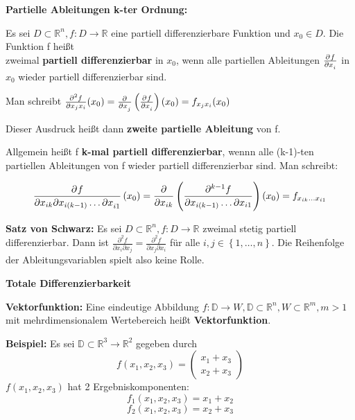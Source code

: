 \documentclass[fontset=ubuntu,12pt,a4paper,fleqn]{article}
\begin{document}
\textbf{Partielle Ableitungen k-ter Ordnung:}

Es sei \(D\subset\mathbb{R}^n,f:D\to\mathbb{R}\) eine partiell differenzierbare Funktion und \(x_0 \in D\). Die Funktion f heißt \\ zweimal \textbf{partiell differenzierbar} in \(x_0\), wenn alle partiellen Ableitungen \(\pd{f}{x_i}\) in \(x_0\) wieder partiell differenzierbar sind.

Man schreibt \(\frac{\partial^2 f}{\partial x_j x_i}(x_0)=\pd{}{x_j}\left(\pd{f}{x_i}\right)(x_0)=f_{x_j x_i}(x_0)\)

Dieser Ausdruck heißt dann \textbf{zweite partielle Ableitung} von f.

Allgemein heißt f \textbf{k-mal partiell differenzierbar}, wennn alle (k-1)-ten partiellen Ableitungen von f wieder partiell differenzierbar sind. Man schreibt:

\[\dpd{f}{x_{ik} \partial x_{i(k-1)} \dots \partial x_{i1}}(x_0) = \frac{\partial}{\partial x_{ik}}\left(\frac{\partial^{k-1} f}{\partial x_{i(k-1)} \dots \partial x_{i1}}\right)(x_0)=f_{x_{ik} \dots x_{i1}}\]

\textbf{Satz von Schwarz:}
Es sei \(D\subset\mathbb{R}^n,f:D\to\mathbb{R}\) zweimal stetig partiell differenzierbar. Dann ist \(\frac{\partial^2 f}{\partial x_i \partial x_j}=\frac{\partial^2 f}{\partial x_j \partial x_i}\) für alle \(i,j\in\left\{1,\dots,n\right\}\). Die Reihenfolge der Ableitungsvariablen spielt also keine Rolle.
\newpage








{\Large\textbf{Totale Differenzierbarkeit}\par}
\textbf{Vektorfunktion:}
Eine eindeutige Abbildung \(f:\mathbb{D}\to W,\mathbb{D}\subset\mathbb{R}^n,W\subset\mathbb{R}^m,m>1\) mit mehrdimensionalem Wertebereich heißt \textbf{Vektorfunktion}.
     
\begin{multicols}{2}
\textbf{Beispiel:}
Es sei \(\mathbb{D}\subset\mathbb{R}^3\to\mathbb{R}^2\) gegeben durch
\[f(x_1,x_2,x_3)=\begin{pmatrix}
x_1+x_3 \\ x_2+x_3
\end{pmatrix}\]
$f(x_1,x_2,x_3)$ hat 2 Ergebniskomponenten:
\[f_1(x_1,x_2,x_3)=x_1+x_2\]
\[f_2(x_1,x_2,x_3)=x_2+x_3\]
\end{multicols}
\end{document}
